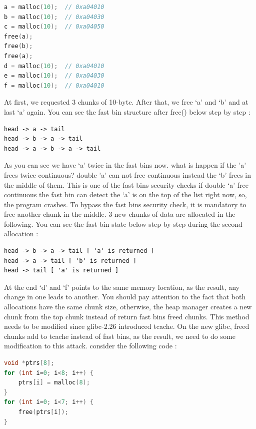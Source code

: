 \documentclass{masterthesis}
\newcommand*\libc{glibc}
\newcommand*\tch{tcache}
\newcommand*\fb{fast bins}
\begin{document}
\begin{lstlisting}[language=c,frame=tlrb]
a = malloc(10);  // 0xa04010
b = malloc(10);  // 0xa04030
c = malloc(10);  // 0xa04050
free(a);
free(b); 
free(a);
d = malloc(10);  // 0xa04010
e = malloc(10);  // 0xa04030
f = malloc(10);  // 0xa04010
\end{lstlisting}

At first, we requested 3 chunks of 10-byte. After that, we free ‘a’ and ‘b’ and at last ‘a' again. You can see the fast bin structure after free() below step by step :

\begin{lstlisting}[frame=tlrb]
head -> a -> tail
head -> b -> a -> tail
head -> a -> b -> a -> tail
\end{lstlisting}

As you can see we have ‘a’ twice in the \fb{} now. what is happen if the 'a' frees twice continuous? double 'a' can not free continuous instead the ‘b’ frees in the middle of them. This is one of the \fb{} security checks if double ‘a’ free continuous the fast bin can detect the ‘a’ is on the top of the list right now, so, the program crashes. To bypass the \fb{} security check, it is mandatory to free another chunk in the middle. 3 new chunks of data are allocated in the following. You can see the fast bin state below step-by-step during the second allocation :

\begin{lstlisting}[frame=tlrb]
head -> b -> a -> tail [ 'a' is returned ]
head -> a -> tail [ 'b' is returned ]
head -> tail [ 'a' is returned ]
\end{lstlisting}

At the end ‘d’ and ‘f’ points to the same memory location, as the result, any change in one leads to another. You should pay attention to the fact that both allocations have the same chunk size, otherwise, the heap manager creates a new chunk from the top chunk instead of return \fb{} freed chunks.
This method needs to be modified since \libc{-2.26} introduced \tch{}. On the new \libc{}, freed chunks add to \tch{} instead of \fb{}, as the result, we need to do some modification to this attack. consider the following code :

\begin{lstlisting}[language=c,frame=tlrb]
void *ptrs[8];
for (int i=0; i<8; i++) {
	ptrs[i] = malloc(8);
}
for (int i=0; i<7; i++) {
	free(ptrs[i]);
}
\end{lstlisting}
\end{document}
